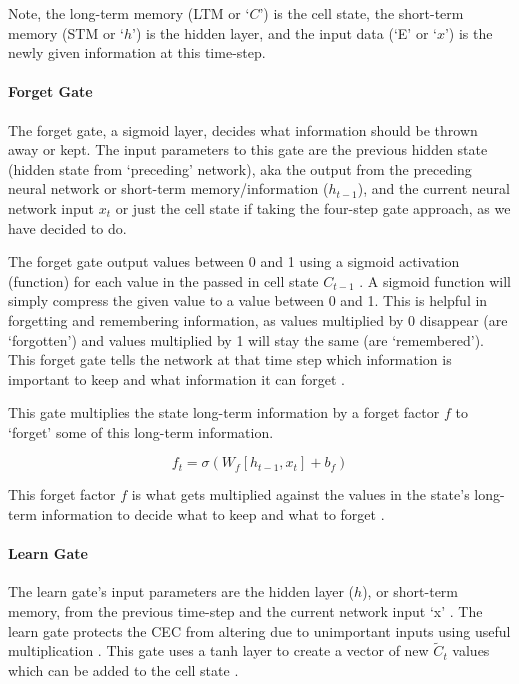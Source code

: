 \documentclass[10pt,twocolumn]{article}
\begin{document}
Note, the long-term memory (LTM or `$C$') is the cell state, the short-term memory (STM or `$h$') is the hidden layer, and the input data (`E' or `$x$') is the newly given information at this time-step.

\paragraph{Forget Gate}

The forget gate, a sigmoid layer, decides what information should be thrown away or kept. The input parameters to this gate are the previous hidden state (hidden state from `preceding' network), aka the output from the preceding neural network or short-term memory/information ($h_{t-1}$), and the current neural network input $x_t$ \cite{UnderstandingLSTMs} or just the cell state \cite{HowLSTMsWork} if taking the four-step gate approach, as we have decided to do.

The forget gate output values between 0 and 1 using a sigmoid activation (function) for each value in the passed in cell state $C_{t-1}$ \cite{UnderstandingLSTMs}. A sigmoid function will simply compress the given value to a value between 0 and 1. This is helpful in forgetting and remembering information, as values multiplied by 0 disappear (are `forgotten') and values multiplied by 1 will stay the same (are `remembered'). This forget gate tells the network at that time step which information is important to keep and what information it can forget \cite{IllustratedGuideToLSTMs}.

This gate multiplies the state long-term information by a forget factor $f$ to `forget' some of this long-term information.

\[
f_t = \sigma(W_f[h_{t-1}, x_t] + b_f)
\]

This forget factor $f$ is what gets multiplied against the values in the  state's long-term information to decide what to keep and what to forget \cite{HowLSTMsWork}.

\paragraph{Learn Gate}

The learn gate's input parameters are the hidden layer ($h$), or short-term memory, from the previous time-step and the current network input `x' \cite{HowLSTMsWork}. The learn gate protects the CEC from altering due to unimportant inputs using useful multiplication \cite{GentleIntroductionToLSTMNetworks}. This gate uses a tanh layer to create a vector of new $\tilde{C}_t$ values which can be added to the cell state \cite{UnderstandingLSTMs}.
\end{document}

